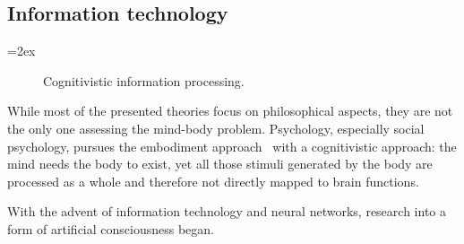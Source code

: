 

\subsection{Information technology}

{\columnsep=2ex\begin{wrapfigure}{r}{.45\linewidth}
\vspace*{-\baselineskip}
\caption{Cognitivistic information processing.}
\vspace*{-\baselineskip}
\end{wrapfigure}
While most of the presented theories focus on philosophical aspects, they are not the only one assessing the mind-body problem.
Psychology, especially social psychology, pursues the embodiment approach~\cite{meier2012embodiment} with a cognitivistic approach: the mind needs the body to exist, yet all those stimuli generated by the body are processed as a whole and therefore not directly mapped to brain functions.\par}

With the advent of information technology and neural networks, research into a form of artificial consciousness began.
